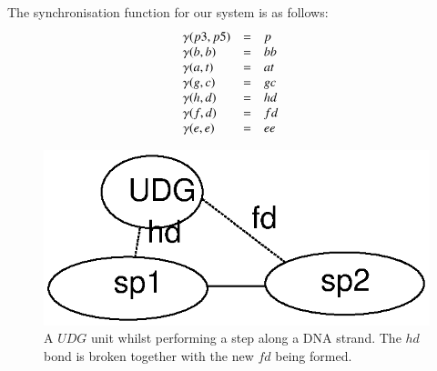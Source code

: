 \documentclass[review]{elsarticle}
\begin{document}
The synchronisation function for our system is as follows:
%
$$\begin{array}{ l c l l }
\gamma(p3,p5) & = & p & \\
\gamma(b,b) & = & bb &\\
\gamma(a,t) & = & at &  \\
\gamma(g,c) & = & gc & \\
\gamma(h,d) & = & hd & \\
\gamma(f,d) & = & fd & \\
\gamma(e,e) & = & ee & \\
\end{array}$$
%
\begin{figure}[h!]
  \centering
    \includegraphics[width=1.0\textwidth]{ber/berintermediate}
  \caption[A $UDG$ unit whilst performing a step along a DNA strand.]{A $UDG$ unit whilst performing a step along a DNA strand. The $hd$ bond is broken together with the new $fd$ being formed.}
  \label{fig:berintermediate}
\end{figure}
\end{document}
